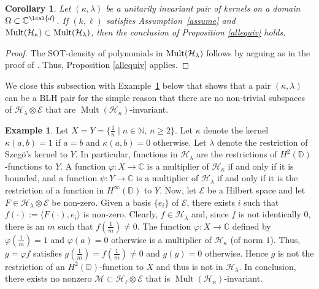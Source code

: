 \documentclass[a4paper,reqno,index]{amsart}
\numberwithin{equation}{section}
\newcommand{\DD}{\mathbb{D}}
\newcommand{\CC}{\mathbb{C}}
\newcommand{\NN}{\mathbb{N}}
\newcommand{\Mult}{\operatorname{Mult}}
\newcommand{\cH}{\mathcal{H}}
\newcommand{\HSE}{\mathcal{E}}
\newcommand{\genk}{\kappa} %
\newcommand{\genl}{\lambda} %
\newtheorem{corollary}[theorem]{Corollary}
\theoremstyle{definition}
\newtheorem{example}[theorem]{Example}
\begin{document}
\begin{corollary}
    \label{c:allequiv}
      Let $(\genk, \genl)$ be   a unitarily invariant pair of kernels on a domain $\Omega\subset\mathbb{C}^{\lcal{d}}$. If $(k,\ell)$ satisfies Assumption~\ref{assume}  and $\textup{Mult}(\mathcal{H}_{\genk})\subset \textup{Mult}(\mathcal{H}_{\genl})$, then the conclusion of Proposition \ref{allequiv} holds.
\end{corollary}

 
\begin{proof}
  The SOT-density of polynomials in $\textup{Mult}(\mathcal{H}_{\genl})$ follows by arguing as in the proof of \cite[Proposition 2.5]{Beurlingfactor}. Thus, Proposition \ref{allequiv} applies. 
\end{proof}





We close this subsection with Example~\ref{eg:BLH-trivial} below that
shows that a pair $(\genk,\genl)$  can be a BLH pair for the simple reason
 that there are  no non-trivial  subspaces
of $\cH_\genl\otimes \HSE$ that are $\Mult(\mathcal{H}_\genk)$-invariant.  

\begin{example}\rm
\label{eg:BLH-trivial}
    Let $X=Y=\{\frac{1}{n} \mid n\in\NN, \, n\ge 2\}.$ Let $\genk$ denote the kernel $\genk(a,b)=1$ if $a=b$ and $\genk(a,b)=0$ otherwise.
    Let $\genl$ denote the restriction of Szeg\"o's kernel to $Y.$   In particular, functions in $\cH_\genl$ are the
    restrictions of  $H^2(\DD)$-functions to $Y.$  A function $\varphi:X\to \CC$  is a multiplier of $\cH_\genk$ if and
    only if it is bounded, and a function $\psi:Y\to\CC$ is a multiplier of $\cH_\genl$ if and only if it is the restriction of 
    a function in $H^\infty(\DD)$ to $Y.$
    Now, let $\mathcal{E}$ be a Hilbert space and let $F\in\mathcal{H}_{\genl}\otimes\mathcal{E}$ be non-zero. Given a basis $\{e_i\}$ of $\mathcal{E}$, there exists $i$ such that $f(\cdot):=\langle F(\cdot), e_i\rangle$ is non-zero. Clearly, $f\in\mathcal{H}_{\genl}$ and,  since $f$ is not identically $0$, there is an $m$ such that  $f(\frac{1}{m})\ne 0.$  The function $\varphi:X\to \CC$ defined by $\varphi(\frac{1}{m})=1$ and $\varphi(a)=0$
     otherwise  is a multiplier of $\cH_\genk$ (of norm $1$). 
     Thus,  $g=\varphi f$ satisfies $g(\frac1m) = f(\frac1m)\ne 0$ and $g(y)=0$ otherwise.  Hence
    $g$ is not the restriction of an $H^2(\DD)$-function to $X$ and thus is not in $\cH_\genl.$  In conclusion, there exists no nonzero $\mathcal{M}\subset\mathcal{H}_{\ell}\otimes\mathcal{E}$ that is $\Mult(\mathcal{H}_\genk)$-invariant.
\end{example}
\end{document}
